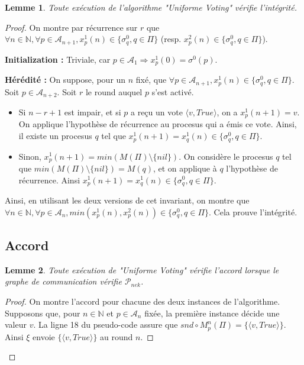 \documentclass{article}
\newtheorem{lemma}{Lemme}
\begin{document}
\begin{lemma}
	Toute exécution de l'algorithme "Uniforme Voting" vérifie l'intégrité.
\end{lemma}
\begin{proof}
	On montre par récurrence sur $r$ que $\forall n \in \mathds{N}, \forall p \in \mathcal{A}_{n+1},  x^1_p(n) \in \{\sigma^0_q, q \in \Pi\}$ (resp. $x^2_p(n) \in \{\sigma^0_q, q \in \Pi\}$).

	\textbf{Initialization :} Triviale, car $p \in \mathcal{A}_1 \Rightarrow x^1_p(0) = \sigma^0(p)$.

	\textbf{Hérédité :} On suppose, pour un $n$ fixé, que $\forall p \in \mathcal{A}_{n+1},  x^1_p(n) \in \{\sigma^0_q, q \in \Pi\}$.
	Soit $p \in \mathcal{A}_{n+2}$. Soit $r$ le round auquel $p$ s'est activé.
	\begin{itemize}

		\item Si $n-r+1$ est impair, et si $p$ a reçu un vote $\langle v, True \rangle$, on a $x^1_p(n+1) = v$. On applique l'hypothèse de récurrence au procesus qui a émis ce vote.
			Ainsi, il existe un procesus $q$ tel que  $x^1_p(n+1) = x^1_q(n) \in \{\sigma^0_q, q \in \Pi\}$.
		\item Sinon, $x^1_p(n+1) = min (M(\Pi) \setminus \{nil\})$. On considère le procesus $q$ tel que $min (M(\Pi) \setminus \{nil\}) = M(q)$,
			et on applique à $q$ l'hypothèse de récurrence. Ainsi $x^1_p(n+1) = x^1_q(n) \in \{\sigma^0_q, q \in \Pi\}$.

	\end{itemize}

	Ainsi, en utilisant les deux versions de cet invariant, on montre que $\forall n \in \mathds{N}, \forall p \in \mathcal{A}_n, min (x^1_p(n), x^2_p(n)) \in \{\sigma^0_q, q \in \Pi\}$.
	Cela prouve l'intégrité.

\subsection{Accord}

	\begin{lemma}
		Toute exécution de "Uniforme Voting" vérifie l'accord lorsque le graphe de communication vérifie $\mathcal{P}_{nek}$.
	\end{lemma}
	\begin{proof}
		On montre l'accord pour chacune des deux instances de l'algorithme.
		Supposons que, pour $n \in \mathds{N}$ et $p \in \mathcal{A}_n$ fixée, la première instance décide une valeur $v$.
		La ligne 18 du pseudo-code assure que $snd \circ M_p^n(\Pi) = \{\langle v, True \rangle\}$.
		Ainsi $\xi$ envoie $\{\langle v, True \rangle\}$ au round $n$.



\end{proof}
\end{proof}
\end{document}
